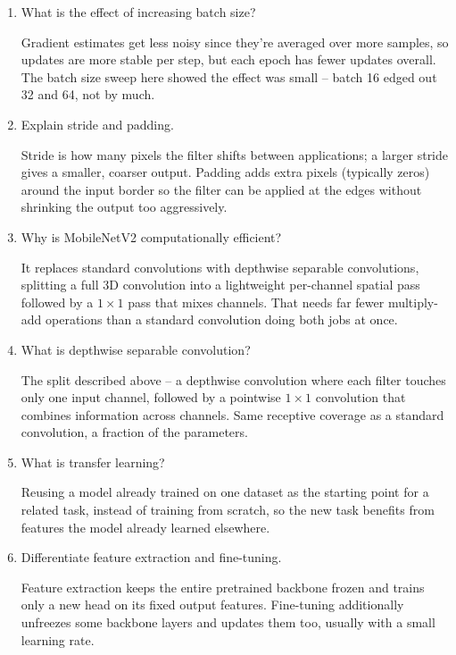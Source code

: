 \documentclass[10pt]{article}
\begin{document}
\begin{enumerate}
Training crawls -- far more epochs are needed to reach the same loss, and it
risks stalling on a plateau before real convergence. The LR sweep showed this
directly: 0.0001 underperformed 0.001 (91.71\% against 92.12\%) under
the same epoch budget.

\item What is the effect of increasing batch size?

Gradient estimates get less noisy since they're averaged over more samples,
so updates are more stable per step, but each epoch has fewer updates
overall. The batch size sweep here showed the effect was small -- batch 16 edged
out 32 and 64, not by much.

\item Explain stride and padding.

Stride is how many pixels the filter shifts between applications; a larger
stride gives a smaller, coarser output. Padding adds extra pixels (typically
zeros) around the input border so the filter can be applied at the edges
without shrinking the output too aggressively.

\item Why is MobileNetV2 computationally efficient?

It replaces standard convolutions with depthwise separable convolutions,
splitting a full 3D convolution into a lightweight per-channel spatial pass
followed by a $1\times1$ pass that mixes channels. That needs far fewer
multiply-add operations than a standard convolution doing both jobs at once.

\item What is depthwise separable convolution?

The split described above -- a depthwise convolution where each filter
touches only one input channel, followed by a pointwise $1\times1$
convolution that combines information across channels. Same receptive
coverage as a standard convolution, a fraction of the parameters.

\item What is transfer learning?

Reusing a model already trained on one dataset as the starting point for a
related task, instead of training from scratch, so the new task benefits
from features the model already learned elsewhere.

\item Differentiate feature extraction and fine-tuning.

Feature extraction keeps the entire pretrained backbone frozen and trains
only a new head on its fixed output features. Fine-tuning additionally
unfreezes some backbone layers and updates them too, usually with a small
learning rate.


\end{enumerate}
\end{document}
